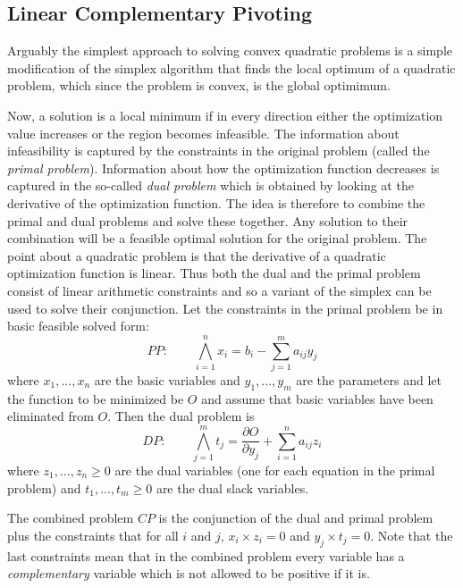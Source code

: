 \documentclass{article}
\begin{document}
\subsection{Linear Complementary Pivoting}
\label{linear-complementary-pivoting}

Arguably the simplest approach to solving convex quadratic problems
is a simple modification of the simplex algorithm
that finds the local optimum of a quadratic problem, which since
the problem is convex, is the global optimimum.

Now, a solution is a local minimum if in every direction either the
optimization value increases or the region becomes infeasible.
The information about infeasibility is captured by the constraints
in the original problem (called the {\em primal problem}).
Information about how the optimization function
decreases is captured in the so-called {\em dual  problem} which
is obtained by looking at the derivative of the optimization function.
The idea is therefore to combine the primal and dual problems
and solve these together. Any solution to their combination will
be a feasible optimal solution for the original problem.
The point about a quadratic problem is that the derivative
of a quadratic optimization function is linear. Thus both the
dual and the primal problem consist of linear arithmetic constraints
and so a variant of the simplex can be used to solve their conjunction.
Let the constraints in the primal problem be in basic feasible
solved form:
\[
PP: \qquad \bigwedge_{i=1}^n x_i = b_i - \sum_{j=1}^m a_{ij} y_j
\]
where $x_1,...,x_n$ are the basic variables and $y_1,...,y_m$ are
the parameters and let the function to be minimized be $O$ and
assume that basic variables have been eliminated from $O$.
Then the dual problem is
\[
DP: \qquad \bigwedge_{j=1}^m t_j =
\frac{ \partial O}{\partial y_j} +  \sum_{i=1}^n a_{ij} z_i
\]
where $z_1,...,z_n \ge 0$ are the dual variables
(one for each equation in the primal problem)
and $t_1,...,t_m \ge 0$ are the dual slack variables.

The combined problem $CP$ is the conjunction of the dual and
primal problem plus the constraints that for all $i$ and $j$,
$x_i \times z_i = 0$ and $y_j \times t_j = 0$.
Note that the last constraints mean that in the combined problem
every variable has a {\em complementary} variable which is not allowed
to be positive if it is.
\end{document}
